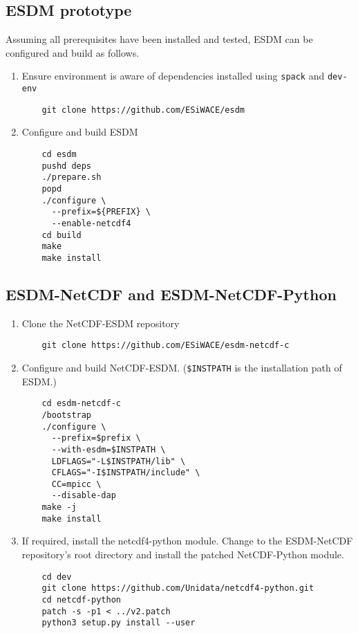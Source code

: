 \subsection{ESDM prototype}
Assuming all prerequisites have been installed and tested, ESDM can be configured and build as follows.
\begin{enumerate}
  \item Ensure environment is aware of dependencies installed using \lstinline|spack| and \lstinline|dev-env|
    \begin{lstlisting}
    git clone https://github.com/ESiWACE/esdm
    \end{lstlisting}
  \item Configure and build ESDM
    \begin{lstlisting}
    cd esdm
    pushd deps
    ./prepare.sh
    popd
    ./configure \
      --prefix=${PREFIX} \
      --enable-netcdf4
    cd build
    make
    make install
    \end{lstlisting}
\end{enumerate}


\subsection{ESDM-NetCDF and ESDM-NetCDF-Python}%
\begin{enumerate}
  \item Clone the NetCDF-ESDM repository
    \begin{lstlisting}
    git clone https://github.com/ESiWACE/esdm-netcdf-c
    \end{lstlisting}
  \item Configure and build NetCDF-ESDM. (\lstinline|$INSTPATH| is the installation path of ESDM.)
    \begin{lstlisting}
    cd esdm-netcdf-c
    /bootstrap
    ./configure \
      --prefix=$prefix \
      --with-esdm=$INSTPATH \
      LDFLAGS="-L$INSTPATH/lib" \
      CFLAGS="-I$INSTPATH/include" \
      CC=mpicc \
      --disable-dap
    make -j
    make install
    \end{lstlisting}
  \item If required, install the netcdf4-python module. 
    Change to the ESDM-NetCDF repository's root directory and install the patched NetCDF-Python module.
    \begin{lstlisting}
    cd dev
    git clone https://github.com/Unidata/netcdf4-python.git
    cd netcdf-python
    patch -s -p1 < ../v2.patch
    python3 setup.py install --user
    \end{lstlisting}
\end{enumerate}

